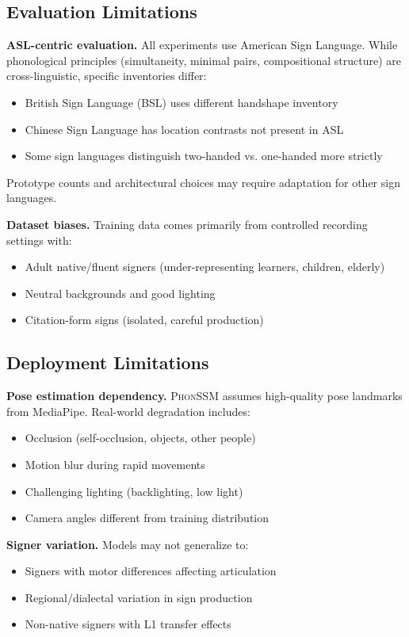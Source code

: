\documentclass{article}
\newcommand{\phonssm}{\textsc{PhonSSM}}
\begin{document}
\subsection{Evaluation Limitations}

\textbf{ASL-centric evaluation.} All experiments use American Sign Language. While phonological principles (simultaneity, minimal pairs, compositional structure) are cross-linguistic, specific inventories differ:
\begin{itemize}[nosep,topsep=2pt,leftmargin=*]
\item British Sign Language (BSL) uses different handshape inventory
\item Chinese Sign Language has location contrasts not present in ASL
\item Some sign languages distinguish two-handed vs. one-handed more strictly
\end{itemize}
Prototype counts and architectural choices may require adaptation for other sign languages.

\textbf{Dataset biases.} Training data comes primarily from controlled recording settings with:
\begin{itemize}[nosep,topsep=2pt,leftmargin=*]
\item Adult native/fluent signers (under-representing learners, children, elderly)
\item Neutral backgrounds and good lighting
\item Citation-form signs (isolated, careful production)
\end{itemize}

\subsection{Deployment Limitations}

\textbf{Pose estimation dependency.} \phonssm{} assumes high-quality pose landmarks from MediaPipe. Real-world degradation includes:
\begin{itemize}[nosep,topsep=2pt,leftmargin=*]
\item Occlusion (self-occlusion, objects, other people)
\item Motion blur during rapid movements
\item Challenging lighting (backlighting, low light)
\item Camera angles different from training distribution
\end{itemize}

\textbf{Signer variation.} Models may not generalize to:
\begin{itemize}[nosep,topsep=2pt,leftmargin=*]
\item Signers with motor differences affecting articulation
\item Regional/dialectal variation in sign production
\item Non-native signers with L1 transfer effects
\end{itemize}
\end{document}
